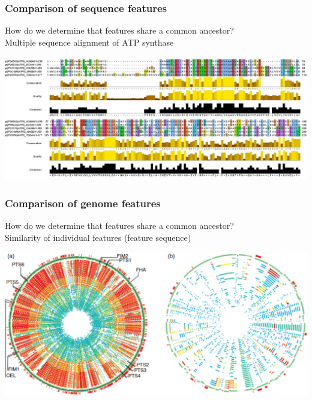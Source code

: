 %
\begin{frame}
  \frametitle{Comparison of sequence features}
  How do we determine that features share a common ancestor? \\
  \textcolor{hutton_blue}{Multiple sequence alignment of ATP synthase} \\
  \begin{center}
    \includegraphics[width=\textwidth]{images/atp_synthase_alignment}
  \end{center}  
\end{frame}

%
\begin{frame}
  \frametitle{Comparison of genome features}
  How do we determine that features share a common ancestor? \\
  \textcolor{hutton_blue}{Similarity of individual features (feature sequence)} \\
  \begin{center}
    \includegraphics[width=\textwidth]{images/salmonella_circular_comparison}
  \end{center}  
\end{frame}


